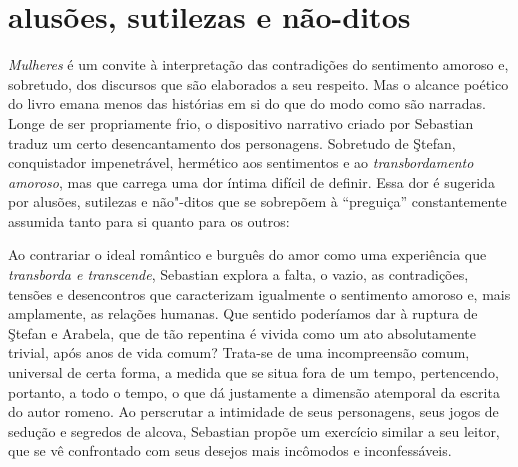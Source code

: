 
\section{alusões, sutilezas e não-ditos}

\emph{Mulheres} é um convite à interpretação das contradições do
sentimento amoroso e, sobretudo, dos discursos que são elaborados a seu
respeito. Mas o alcance poético do livro emana menos das histórias em
si do que do modo como são narradas. Longe de ser propriamente frio,
o dispositivo narrativo criado por Sebastian traduz um certo
desencantamento dos personagens. Sobretudo de Ştefan, conquistador
impenetrável, hermético aos sentimentos e ao \textit{transbordamento amoroso}, mas
que carrega uma dor íntima difícil de definir. Essa dor é sugerida por
alusões, sutilezas e não"-ditos que se sobrepõem à ``preguiça''
constantemente assumida tanto para si quanto para os outros: 

\begin{quote}
\end{quote}

Ao contrariar o ideal romântico e burguês do amor como uma experiência
que \textit{transborda e transcende}, Sebastian explora a falta, o vazio, as
contradições, tensões e desencontros que caracterizam igualmente o
sentimento amoroso e, mais amplamente, as relações humanas. Que sentido
poderíamos dar à ruptura de Ştefan e Arabela, que de tão repentina é
vivida como um ato absolutamente trivial, após anos de vida comum?
Trata-se de uma incompreensão comum, universal de certa forma, a medida
que se situa fora de um tempo, pertencendo, portanto, a todo o tempo, o
que dá justamente a dimensão atemporal da escrita do autor romeno. Ao
perscrutar a intimidade de seus personagens, seus jogos de sedução e
segredos de alcova, Sebastian propõe um exercício similar a seu
leitor, que se vê confrontado com seus desejos mais incômodos e
inconfessáveis.

